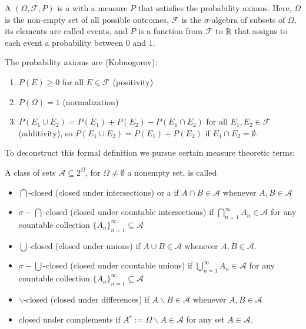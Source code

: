 \documentclass[12pt, a4paper, oneside, openright, titlepage]{book}
\begin{document}
\begin{defn}
    A  $(\Omega, \mathcal{F}, P)$ is a  with a measure $P$ that satisfies the probability axioms. Here, $\Omega$ is the non-empty set of all possible outcomes, $\mathcal{F}$ is the $\sigma$-algebra of subsets of $\Omega$, its elements are called events, and $P$ is a function from $\mathcal{F}$ to $\mathbb R$ that assigns to each event a probability between $0$ and $1$.

    The probability axioms are (Kolmogorov):
    \begin{enumerate}
        \item $P(E) \geq 0$ for all $E \in \mathcal{F}$ (positivity)
        \item $P(\Omega) = 1$ (normalization)
        \item $P(E_1\cup E_2) = P(E_1) + P(E_2) - P(E_1\cap E_2)$ for all $E_1,E_2 \in \mathcal{F}$ (additivity), so $P(E_1\cup E_2) = P(E_1)+P(E_2)$ if $E_1\cap E_2 = \emptyset$.
    \end{enumerate}
\end{defn}

To deconstruct this formal definition we pursue certain measure theoretic terms:

\begin{defn}
    A class of sets $\mathcal{A} \subseteq 2^{\Omega}$, for $\Omega \neq \emptyset$ a nonempty set, is called \begin{itemize}
        \item $\bigcap$-closed (closed under intersections) or a  if $A\cap B \in \mathcal{A}$ whenever $A,B \in \mathcal{A}$
        \item $\sigma-\bigcap$-closed (closed under countable intersections) if $\bigcap_{n=1}^{\infty}A_n\in \mathcal{A}$ for any countable collection $\{A_n\}_{n=1}^{\infty}\subseteq \mathcal{A}$
        \item $\bigcup$-closed (closed under unions) if $A\cup B \in \mathcal{A}$ whenever $A,B \in \mathcal{A}$.
        \item $\sigma-\bigcup$-closed (closed under countable unions) if $\bigcup_{n=1}^{\infty}A_n\in \mathcal{A}$ for any countable collection $\{A_n\}_{n=1}^{\infty}\subseteq \mathcal{A}$
        \item $\backslash$-closed (closed under differences) if $A\backslash B\in \mathcal{A}$ whenever $A,B \in \mathcal{A}$
        \item closed under complements if $A^c:= \Omega\backslash A \in \mathcal{A}$ for any set $A \in \mathcal{A}$.
    \end{itemize}
\end{defn}
\end{document}
